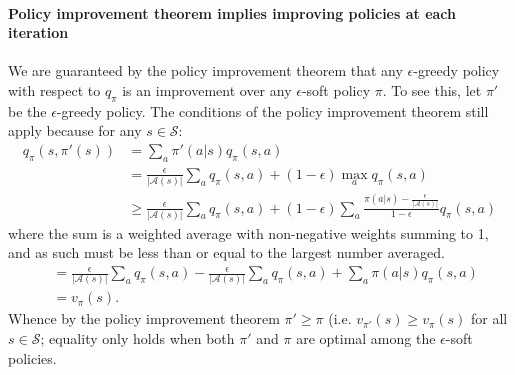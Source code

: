 \documentclass[12pt]{article}
\begin{document}
\paragraph{Policy improvement theorem implies improving policies at each iteration}
We are guaranteed by the policy improvement theorem that any $\epsilon$-greedy policy with respect to $q_\pi$ is an improvement over any $\epsilon$-soft policy $\pi$. To see this, let $\pi'$ be the $\epsilon$-greedy policy. The conditions of the policy improvement theorem still apply because for any $s \in \mathcal S$:
\begin{align}
  q_\pi(s, \pi'(s)) &= \sum_a \pi'(a|s) q_\pi(s,a) \nonumber \\
  \label{eq: epsilonsoftgreedy}
                    &= \frac{\epsilon}{|\mathcal A(s)|} \sum_a q_\pi(s,a) +                       (1-\epsilon) \max_a q_\pi(s,a) \\
                    &\geq \frac{\epsilon}{|\mathcal A(s)|} \sum_a q_\pi(s,a) + (1-\epsilon) \sum_a \frac{\pi(a|s) - \frac{\epsilon}{|\mathcal A(s)|}}{1-\epsilon} q_\pi(s,a) \nonumber
\end{align}
where the sum is a weighted average with non-negative weights summing to 1, and as such must be less than or equal to the largest number averaged.
\begin{align}
  &= \frac{\epsilon}{|\mathcal A(s)|} \sum_a q_\pi(s,a) - \frac{\epsilon}{|\mathcal A(s)|} \sum_a q_\pi(s,a) + \sum_a \pi(a|s) q_\pi(s,a)   \\
  &= v_\pi(s).
\end{align}
Whence by the policy improvement theorem $\pi' \geq \pi$ (i.e. $v_{\pi'}(s) \geq v_{\pi}(s)$ for all $s \in \mathcal S$; equality only holds when both $\pi'$ and $\pi$ are optimal among the $\epsilon$-soft policies.
\end{document}

